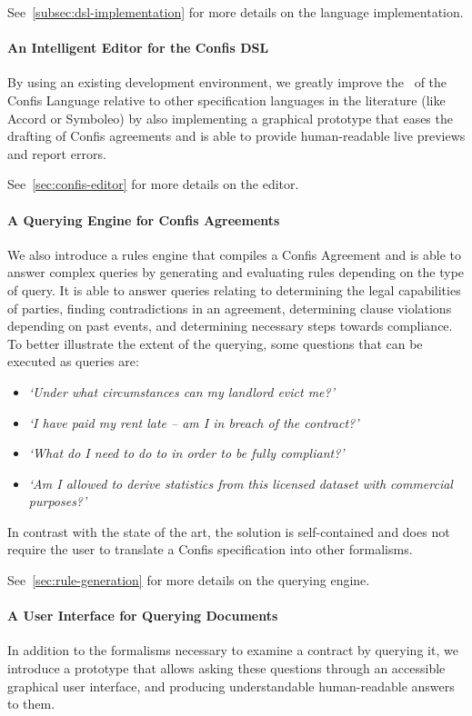 See~\autoref{subsec:dsl-implementation} for more details on the language implementation.

\paragraph{An Intelligent Editor for the Confis DSL}
By using an existing development environment, we greatly improve the~ of the Confis Language relative to other specification languages in the literature (like Accord or Symboleo) by also implementing a graphical prototype that eases the drafting of Confis agreements and is able to provide human-readable live previews and report errors.

See~\autoref{sec:confis-editor} for more details on the editor.

\paragraph{A Querying Engine for Confis Agreements} We also introduce a rules engine that compiles a Confis Agreement and is able to answer complex queries by generating and evaluating rules depending on the type of query.
It is able to answer queries relating to determining the legal capabilities of parties, finding contradictions in an agreement, determining clause violations depending on past events, and determining necessary steps towards compliance.
To better illustrate the extent of the querying, some questions that can be executed as queries are:
\begin{itemize}
    \item \emph{`Under what circumstances can my landlord evict me?'}
    \item \emph{`I have paid my rent late -- am I in breach of the contract?'}
    \item \emph{`What do I need to do to in order to be fully compliant?'}
    \item \emph{`Am I allowed to derive statistics from this licensed dataset with commercial purposes?'}
\end{itemize}
In contrast with the state of the art, the solution is self-contained and does not require the user to translate a Confis specification into other formalisms.

See~\autoref{sec:rule-generation} for more details on the querying engine.


\paragraph{A User Interface for Querying Documents} In addition to the formalisms necessary to examine a contract by querying it, we introduce a prototype that allows asking these questions through an accessible graphical user interface, and producing understandable human-readable answers to them.


